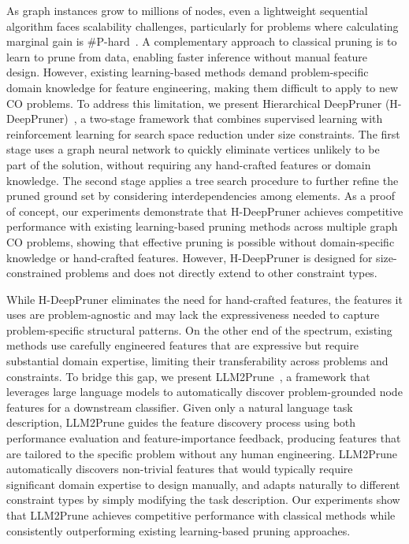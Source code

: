 As graph instances grow to millions of nodes, even a lightweight sequential algorithm
faces scalability challenges, particularly for problems where calculating marginal gain
is \#P-hard~\citep{chen2010scalable}.
A complementary approach to classical pruning is to learn to prune from data, enabling
faster inference without manual feature design. However, existing learning-based methods
demand problem-specific domain knowledge for feature engineering, making them difficult
to apply to new CO problems. To address this limitation, we present
Hierarchical DeepPruner (H-DeepPruner)~\citep{nath2025hdeeppruner}, a
two-stage framework that combines supervised learning with reinforcement learning for
search space reduction under size constraints. The first stage uses a graph neural
network to quickly eliminate vertices unlikely to be part of the solution, without
requiring any hand-crafted features or domain knowledge. The second stage applies a
tree search procedure to further refine the pruned ground set by considering
interdependencies among elements. As a proof of concept, our experiments demonstrate
that H-DeepPruner achieves competitive performance with existing learning-based pruning
methods across multiple graph CO problems, showing that effective pruning is possible
without domain-specific knowledge or hand-crafted features. However,
H-DeepPruner is designed for size-constrained problems and does not directly extend to
other constraint types.

While H-DeepPruner eliminates the need for hand-crafted features, the features it uses
are problem-agnostic and may lack the expressiveness needed to capture problem-specific
structural patterns. On the other end of the spectrum, existing methods use carefully
engineered features that are expressive but require substantial domain expertise,
limiting their transferability across problems and constraints. To bridge this gap, we
present LLM2Prune~\citep{nath2026llmprune}, a framework that leverages large language
models to automatically discover problem-grounded node features for a downstream
classifier. Given only a natural language task description, LLM2Prune guides the feature
discovery process using both performance evaluation and feature-importance feedback,
producing features that are tailored to the specific problem without any human
engineering. LLM2Prune automatically discovers non-trivial features that would typically
require significant domain expertise to design manually, and adapts naturally to
different constraint types by simply modifying the task description. Our experiments
show that LLM2Prune achieves competitive performance with classical methods while
consistently outperforming existing learning-based pruning approaches.



